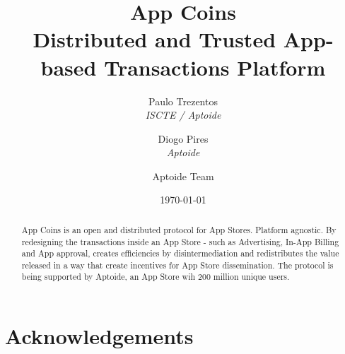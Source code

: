 \documentclass[12pt, a4paper, twoside, titlepage]{article}
\title{App Coins \\ Distributed and Trusted App-based Transactions Platform}
\author{Paulo Trezentos  \\
  {\em ISCTE / Aptoide}  \\
  \and 
  Diogo Pires \\
  {\em Aptoide} \\
  \and
  Aptoide Team
  }
\date{\today}
\begin{document}
\maketitle


\begin{abstract}
App Coins is an open and distributed protocol for App Stores. Platform agnostic. 
By redesigning the transactions inside an App Store - such as Advertising, In-App Billing and App approval, creates efficiencies by disintermediation and redistributes the value released in a way that create incentives for App Store dissemination.
The protocol is being supported by Aptoide, an App Store wih 200 million unique users. 
\end{abstract}














\section{Acknowledgements}



\end{document}

